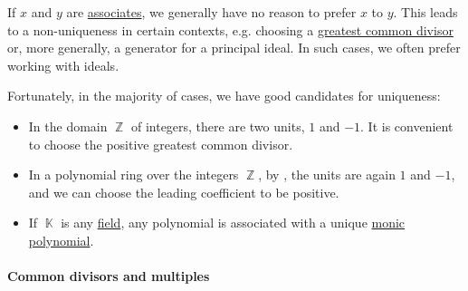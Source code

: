 \begin{remark}\label{rem:choice_of_associates}
  If \( x \) and \( y \) are \hyperref[def:domain_divisibility/associates]{associates}, we generally have no reason to prefer \( x \) to \( y \). This leads to a non-uniqueness in certain contexts, e.g. choosing a \hyperref[def:gcd]{greatest common divisor} or, more generally, a generator for a principal ideal. In such cases, we often prefer working with ideals.

  Fortunately, in the majority of cases, we have good candidates for uniqueness:
  \begin{itemize}
    \item In the domain \( \BbbZ \) of integers, there are two units, \( 1 \) and \( -1 \). It is convenient to choose the positive greatest common divisor.

    \item In a polynomial ring over the integers \( \BbbZ \), by , the units are again \( 1 \) and \( -1 \), and we can choose the leading coefficient to be positive.

    \item If \( \BbbK \) is any \hyperref[def:field]{field}, any polynomial is associated with a unique \hyperref[def:monic_polynomial]{monic polynomial}.
  \end{itemize}
\end{remark}

\paragraph{Common divisors and multiples}

